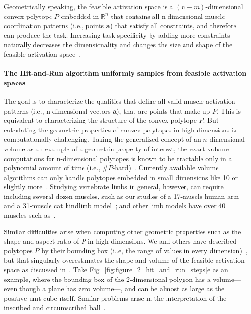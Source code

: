 \documentclass[letterpaper]{article}
\begin{document}
Geometrically speaking, the feasible activation space is a $(n-m)$-dimensional convex polytope $P$ embedded in $\mathbb{R}^n$ that contains all n-dimensional muscle coordination patterns (i.e., points $\textbf{a}$) that satisfy all constraints, and therefore can produce the task. Increasing task specificity by adding more constraints naturally decreases the dimensionality and changes the size and shape of the feasible activation space~\cite{Kuo1993Human,sohn2013cat_bounding_box,inouye2016muscle}.


\paragraph*{The Hit-and-Run algorithm uniformly samples from feasible activation spaces}
\label{ss:hitrun}

The goal is to characterize the qualities that define all valid muscle activation patterns (i.e., n-dimensional vectors $\textbf{a}$), that are points that make up $P$. This is equivalent to characterizing the structure of the convex polytope $P$. But calculating the geometric properties of convex polytopes in high dimensions is computationally challenging. Taking the generalized concept of an $n$-dimensional volume as an example of a geometric property of interest, the exact volume computations for n-dimensional polytopes is known to be tractable only in a polynomial amount of time (i.e., $\#P$-hard)~\cite{Dyer}.
Currently available volume algorithms can only handle polytopes embedded in small dimensions like 10 or slightly more~\cite{Bueler2}. Studying vertebrate limbs in general, however, can require including several dozen muscles, such as our studies of a 17-muscle human arm and a 31-muscle cat hindlimb model~\cite{Valero-Cuevas2015high-dimensional}; and other limb models have over 40 muscles such as~\cite{arnold2010model, kutch2012challenges, hamner2010muscle, de2014human}.

Similar difficulties arise when computing other geometric properties such as the shape and aspect ratio of $P$ in high dimensions. We and others have described polytopes $P$ by their bounding box (i..e, the range of values in every dimension)~\cite{sohn2013cat_bounding_box,kutch2011muscle}, but that singularly overestimates the shape and volume of the feasible activation space as discussed in~\cite{Valero-Cuevas2015high-dimensional}.
Take Fig.~\ref{fig:figure_2_hit_and_run_steps}e as an example, where the bounding box of the 2-dimensional polygon has a volume---even though a plane has zero volume---, and can be almost as large as the positive unit cube itself. Similar problems arise in the interpretation of the inscribed and circumscribed ball~\cite{inouye2014optimizing}.
\end{document}
